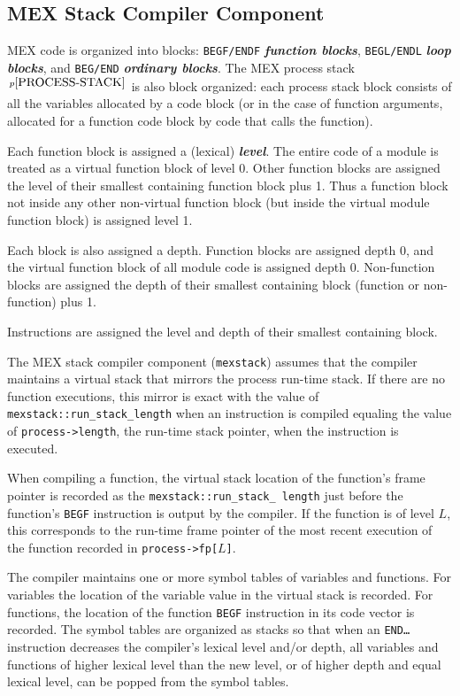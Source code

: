 \documentclass[12pt]{article}
\newcommand{\key}[1]{{\bf \em #1}\index{#1}}
\newcommand{\skey}[2]{{\bf \em #1#2}\index{#1}}
\newcommand{\pagnote}[1]{$\,^{p\pageref{#1}}$}
\newcommand{\EOL}{\penalty \exhyphenpenalty}
\begin{document}
\subsection{MEX Stack Compiler Component}
\label{MEX-STACK-COMPILER-COMPONENT}

MEX code is organized into blocks: {\tt BEGF/ENDF} \skey{function block}s,
{\tt BEGL/ENDL} \skey{loop block}s, and {\tt BEG/END} \skey{ordinary block}s.
The MEX process stack\pagnote{PROCESS-STACK} is also block organized:
each process stack block consists of all the variables allocated
by a code block (or in the case of function arguments, allocated for
a function code block by code that calls the function).

Each function block is assigned a (lexical) \key{level}.
The entire code of a module is treated as a virtual function block
of level 0.  Other function blocks are assigned the level of their
smallest containing function block plus 1.  Thus
a function block not inside any other non-virtual function block
(but inside the virtual module function block) is assigned level 1.

Each block is also assigned a depth.  Function blocks are assigned depth
0, and the virtual function block of all module code is assigned depth 0.
Non-function blocks are assigned the depth
of their smallest containing block (function or non-function) plus 1.

Instructions are assigned the level and depth of their smallest containing
block.

The MEX stack compiler component ({\tt mexstack}) assumes that the compiler
maintains a virtual stack that mirrors the process run-time stack.
If there are no function executions, this mirror is exact with the value of
{\tt mexstack::\EOL run\_\EOL stack\_\EOL length}
when an instruction is compiled equaling the value of
{\tt process->length}, the run-time stack pointer, when the
instruction is executed.

When compiling a function, the virtual stack location of the function's
frame pointer is recorded as the {\tt mexstack::\EOL run\_\EOL stack\_\EOL
length} just before the function's {\tt BEGF} instruction is output by the
compiler.  If the function is of level $L$, this corresponds to the
run-time frame pointer of the most recent execution of the function
recorded in {\tt process->fp[$L$]}.

The compiler maintains one or more symbol tables of variables
and functions.  For variables the location of the variable value
in the virtual stack is recorded.  For functions, the location of
the function {\tt BEGF} instruction in its code vector is recorded.
The symbol tables are organized as stacks so that
when an {\tt END\ldots} instruction decreases the compiler's lexical
level and/or depth, all variables and functions of higher lexical level
than the new level, or of higher depth and equal lexical level, can be
popped from the symbol tables.
\end{document}
